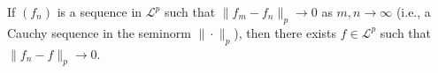 If $(f_n)$ is a sequence in $\mathcal{L}^p$ such that $\|f_m - f_n\|_p \to 0$ as $m, n \to \infty$ (i.e., a Cauchy sequence in the seminorm $\|\cdot\|_p$), then there exists $f \in \mathcal{L}^p$ such that $\|f_n - f\|_p \to 0$.
